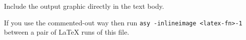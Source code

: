 \documentclass{article}
\begin{document}
Include the output graphic directly in the text body.
\begin{center}
\end{center}  
If you use the commented-out way then run 
\texttt{asy -inlineimage <latex-fn>-1}
between a pair of \LaTeX{} runs of this file.
\end{document}
